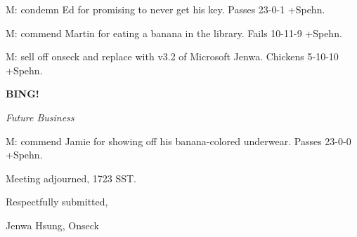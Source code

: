 \documentclass[12pt]{article}
\newcommand{\bing}{{\bf BING!} }
\newcommand{\goto}[1]{\bing \vskip 12pt \centerline{{\em{#1}}}}
\begin{document}
M: condemn Ed for promising to never get his key. Passes 23-0-1 +Spehn.

M: commend Martin for eating a banana in the library. Fails 10-11-9 +Spehn.

M: sell off onseck and replace with v3.2 of Microsoft Jenwa. Chickens 5-10-10 +Spehn.

\goto{Future Business}

M: commend Jamie for showing off his banana-colored underwear. Passes 23-0-0 +Spehn.

\vspace{12pt}

\noindent
Meeting adjourned, 1723 SST.

\vspace{18pt}

\centerline{Respectfully submitted,}
\centerline{Jenwa Hsung, Onseck}
\end{document}
